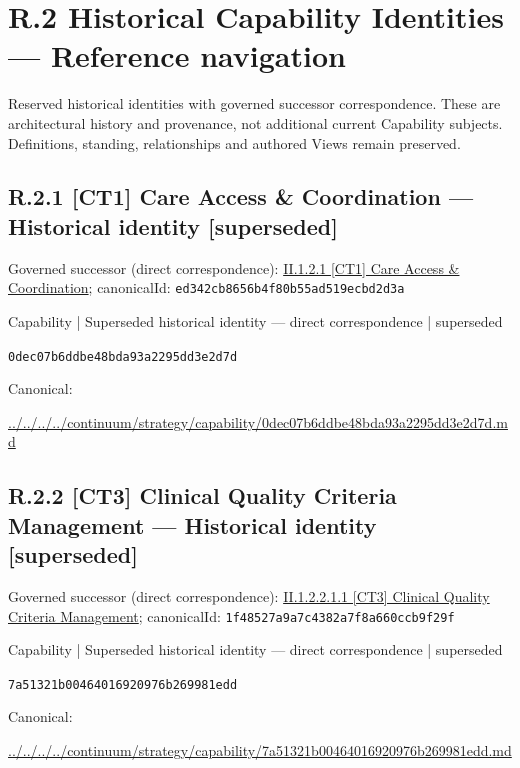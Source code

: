 \documentclass[10pt,a4paper]{article}
\begin{document}
\section*{R.2 Historical Capability Identities — Reference navigation}
Reserved historical identities with governed successor correspondence. These are architectural history and provenance, not additional current Capability subjects. Definitions, standing, relationships and authored Views remain preserved.\par
\subsection*{R.2.1 [CT1] Care Access \& Coordination — Historical identity [superseded]}
Governed successor (direct correspondence): \hyperref[element-ed342cb8656b4f80b55ad519ecbd2d3a]{II.1.2.1 [CT1] Care Access \& Coordination}; canonicalId: \texttt{ed342cb8656b4f80b55ad519ecbd2d3a}\par
\label{element-0dec07b6ddbe48bda93a2295dd3e2d7d}
{\small Capability | Superseded historical identity — direct correspondence | superseded}\par
\texttt{0dec07b6ddbe48bda93a2295dd3e2d7d}\par
Canonical: \par
{\footnotesize\url{../../../../continuum/strategy/capability/0dec07b6ddbe48bda93a2295dd3e2d7d.md}}\par
\subsection*{R.2.2 [CT3] Clinical Quality Criteria Management — Historical identity [superseded]}
Governed successor (direct correspondence): \hyperref[element-1f48527a9a7c4382a7f8a660ccb9f29f]{II.1.2.2.1.1 [CT3] Clinical Quality Criteria Management}; canonicalId: \texttt{1f48527a9a7c4382a7f8a660ccb9f29f}\par
\label{element-7a51321b00464016920976b269981edd}
{\small Capability | Superseded historical identity — direct correspondence | superseded}\par
\texttt{7a51321b00464016920976b269981edd}\par
Canonical: \par
{\footnotesize\url{../../../../continuum/strategy/capability/7a51321b00464016920976b269981edd.md}}\par
\end{document}

